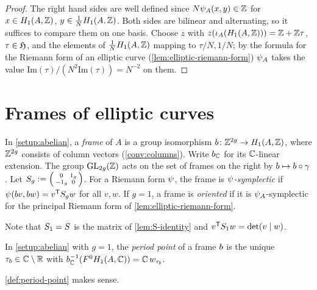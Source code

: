 \begin{proof}
The right hand sides are well defined since $N\psi_{A}(x,y) \in \mathbb{Z}$
for $x \in H_{1}(A,\mathbb{Z})$, $y \in \frac{1}{N}H_{1}(A,\mathbb{Z})$. Both
sides are bilinear and alternating, so it suffices to compare them on one
basis. Choose $z$ with $z(\iota_{A}(H_{1}(A,\mathbb{Z}))) =
\mathbb{Z}+\mathbb{Z}\tau$, $\tau \in \mathfrak{H}$, and the elements of
$\tfrac{1}{N}H_{1}(A,\mathbb{Z})$ mapping to $\tau/N, 1/N$; by the formula
for the Riemann form of an elliptic curve (\cref{lem:elliptic-riemann-form})
$\psi_{A}$ takes the value $\mathrm{Im}(\tau)/(N^{2}\mathrm{Im}(\tau)) = N^{-2}$
on them.
\end{proof}

\section{Frames of elliptic curves}

\begin{definition}[Frames]\label{def:frames}
In \cref{setup:abelian}, a \emph{frame} of $A$ is a group isomorphism
$b \colon \mathbb{Z}^{2g} \to H_{1}(A,\mathbb{Z})$, where
$\mathbb{Z}^{2g}$ consists of column vectors (\cref{conv:columns}).
Write ${b}_{\mathbb{C}}$ for its $\mathbb{C}$-linear extension. The group
$\GL{2g}{\ZZ}$ acts on the set of frames on the right by
$b \mapsto b\circ\gamma$. Let
$S_{g} := \left(\begin{smallmatrix} 0 & 1_{g} \\ -1_{g} & 0 \end{smallmatrix}\right)$.
For a Riemann form $\psi_{}$, the frame is
\emph{$\psi_{}$-symplectic} if
$\psi_{}(b v, b w) = {v}^{\mathsf{T}}S_{g}w$ for all
$v, w$. If $g = 1$, a frame is \emph{oriented} if it is
$\psi_{A}$-symplectic for the principal Riemann form of
\cref{lem:elliptic-riemann-form}.
\end{definition}

Note that $S_{1} = S$ is the matrix of \cref{lem:S-identity}
and ${v}^{\mathsf{T}}S_{1}w = \det(v\mid w)$.

\begin{definition}\label{def:period-point}
In \cref{setup:abelian} with $g = 1$, the \emph{period point} of a frame
$b$ is the unique $\tau_{b} \in \mathbb{C}\setminus\mathbb{R}$ with
${b}_{\mathbb{C}}^{-1}(F^{0}H_{1}(A,\mathbb{C})) =
\mathbb{C}\,w_{\tau_{b}}$.
\end{definition}

\begin{lemma}\label{lem:period-point-exists}
\cref{def:period-point} makes sense.
\end{lemma}


